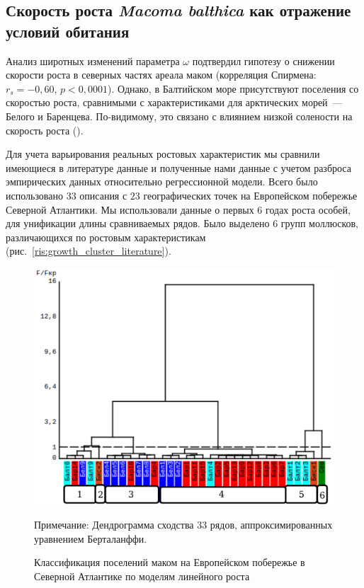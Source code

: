 {\subsection*{Скорость роста {\it Macoma balthica} как отражение условий обитания}
Анализ широтных изменений параметра $\omega$ подтвердил гипотезу о снижении скорости роста в северных частях ареала маком (корреляция Спирмена: $r_{s} = -0,60$, $p < 0,0001$).
Однако, в Балтийском море присутствуют поселения со скоростью роста, сравнимыми с характеристиками для арктических морей~--- Белого и Баренцева. 
По-видимому, это связано с влиянием низкой солености на скорость роста (\cite{Segerstrale_1960, Kube_et_al_1996}).

Для учета варьирования реальных ростовых характеристик мы сравнили имеющиеся в литературе данные и полученные нами данные с учетом разброса эмпирических данных относительно регрессионной модели.
Всего было использовано $33$ описания с $23$ географических точек на Европейском побережье Северной Атлантики.
Мы использовали данные о первых $6$ годах роста особей, для унификации длины сравниваемых рядов.
Было выделено $6$ групп моллюсков, различающихся по ростовым характеристикам (рис.~\ref{ris:growth_cluster_literature}).
	\begin{figure}[ht]
	\begin{center}	
		\includegraphics[height=0.4\textheight]{../Growth_sravnenie/Europe_clusters_usrednenie.pdf}
	\end{center}
		\caption{Классификация поселений маком на Европейском побережье в Северной Атлантике по моделям линейного роста}
	\footnotesize{Примечание: Дендрограмма сходства 33 рядов, аппроксимированных уравнением Берталанффи. 
}
\end{figure}}
